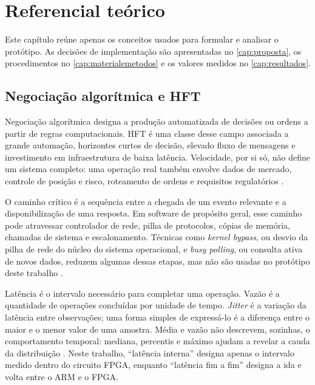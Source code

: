 
\chapter{Referencial teórico}\label{cap:referencialTeorico}

Este capítulo reúne apenas os conceitos usados para formular e analisar o protótipo. As decisões de implementação são apresentadas no \autoref{cap:proposta}, os procedimentos no \autoref{cap:materialemetodos} e os valores medidos no \autoref{cap:resultados}.

\section{Negociação algorítmica e HFT}\label{sec:hft}

Negociação algorítmica designa a produção automatizada de decisões ou ordens a partir de regras computacionais. HFT é uma classe desse campo associada a grande automação, horizontes curtos de decisão, elevado fluxo de mensagens e investimento em infraestrutura de baixa latência. Velocidade, por si só, não define um sistema completo: uma operação real também envolve dados de mercado, controle de posição e risco, roteamento de ordens e requisitos regulatórios \cite{Aldridge2013,HasbrouckSaar2013}.

O caminho crítico é a sequência entre a chegada de um evento relevante e a disponibilização de uma resposta. Em software de propósito geral, esse caminho pode atravessar controlador de rede, pilha de protocolos, cópias de memória, chamadas de sistema e escalonamento. Técnicas como \textit{kernel bypass}, ou desvio da pilha de rede do núcleo do sistema operacional, e \textit{busy polling}, ou consulta ativa de novos dados, reduzem algumas dessas etapas, mas não são usadas no protótipo deste trabalho \cite{Rizzo2012,Jeong2014}.

Latência é o intervalo necessário para completar uma operação. Vazão é a quantidade de operações concluídas por unidade de tempo. \textit{Jitter} é a variação da latência entre observações; uma forma simples de expressá-lo é a diferença entre o maior e o menor valor de uma amostra. Média e vazão não descrevem, sozinhas, o comportamento temporal: mediana, percentis e máximo ajudam a revelar a cauda da distribuição \cite{Jain1991}. Neste trabalho, ``latência interna'' designa apenas o intervalo medido dentro do circuito FPGA, enquanto ``latência fim a fim'' designa a ida e volta entre o ARM e o FPGA.

